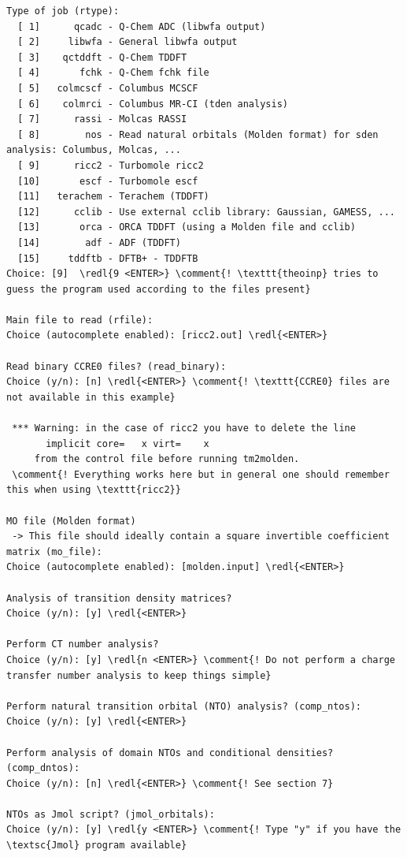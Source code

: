 \documentclass[DIV=12,headings=normal]{scrartcl}
\newcommand{\comment}[1]{\textcolor{blue}{#1}}
\newcommand{\redl}[1]{{\textcolor{red}{\underline{#1}}}}
\newcounter{number}
\begin{document}
\scriptsize
\begin{Verbatim}[commandchars=\\\{\}]
Type of job (rtype):
  [ 1]      qcadc - Q-Chem ADC (libwfa output)
  [ 2]     libwfa - General libwfa output
  [ 3]    qctddft - Q-Chem TDDFT
  [ 4]       fchk - Q-Chem fchk file
  [ 5]   colmcscf - Columbus MCSCF
  [ 6]    colmrci - Columbus MR-CI (tden analysis)
  [ 7]      rassi - Molcas RASSI
  [ 8]        nos - Read natural orbitals (Molden format) for sden analysis: Columbus, Molcas, ...
  [ 9]      ricc2 - Turbomole ricc2
  [10]       escf - Turbomole escf
  [11]   terachem - Terachem (TDDFT)
  [12]      cclib - Use external cclib library: Gaussian, GAMESS, ...
  [13]       orca - ORCA TDDFT (using a Molden file and cclib)
  [14]        adf - ADF (TDDFT)
  [15]     tddftb - DFTB+ - TDDFTB
Choice: [9]  \redl{9 <ENTER>} \comment{! \texttt{theoinp} tries to guess the program used according to the files present}

Main file to read (rfile):
Choice (autocomplete enabled): [ricc2.out] \redl{<ENTER>}

Read binary CCRE0 files? (read_binary):
Choice (y/n): [n] \redl{<ENTER>} \comment{! \texttt{CCRE0} files are not available in this example}

 *** Warning: in the case of ricc2 you have to delete the line
       implicit core=   x virt=    x
     from the control file before running tm2molden.
 \comment{! Everything works here but in general one should remember this when using \texttt{ricc2}}

MO file (Molden format)
 -> This file should ideally contain a square invertible coefficient matrix (mo_file):
Choice (autocomplete enabled): [molden.input] \redl{<ENTER>}

Analysis of transition density matrices?
Choice (y/n): [y] \redl{<ENTER>}

Perform CT number analysis?
Choice (y/n): [y] \redl{n <ENTER>} \comment{! Do not perform a charge transfer number analysis to keep things simple}

Perform natural transition orbital (NTO) analysis? (comp_ntos):
Choice (y/n): [y] \redl{<ENTER>}

Perform analysis of domain NTOs and conditional densities? (comp_dntos):
Choice (y/n): [n] \redl{<ENTER>} \comment{! See section 7}

NTOs as Jmol script? (jmol_orbitals):
Choice (y/n): [y] \redl{y <ENTER>} \comment{! Type "y" if you have the \textsc{Jmol} program available}


\end{Verbatim}
\end{document}
